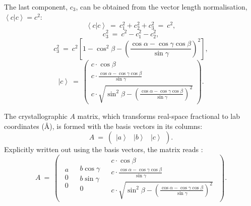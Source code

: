 The last component, $c_3$, can be obtained from the vector length normalisation, $ \left< c | c \right> = c^2 $:
\begin{equation} \left< c | c \right > \ =\  c_1^2 + c_2^2 + c_3^2 \ =\  c^2, \end{equation}
\begin{equation} c_3^2 \ =\  c^2 - c_1^2 - c_2^2, \end{equation}
\begin{equation} 
	c_3^2 \ =\  c^2 \left[1 - \cos^2 \beta - \left(\frac{\cos \alpha - \cos \gamma \cos \beta}{\sin \gamma} \right)^2 \right], 
\end{equation}
\begin{equation} \boxed{ \left| c \right> \ =\  \left( \begin{array}{c}
	c \cdot \cos \beta \\
	c \cdot \frac{\cos \alpha - \cos \gamma \cos \beta}{\sin \gamma} \\
	c \cdot \sqrt{ \sin^2 \beta - \left(\frac{\cos \alpha - \cos \gamma \cos \beta}{\sin \gamma} \right)^2 }
\end{array} \right). } \end{equation}



The crystallographic $A$ matrix, which transforms real-space fractional to lab coordinates (\AA), is formed with the basis vectors in its columns:
\begin{equation}
	A \ =\  \left(
		\begin{array}{ccc}
			\left| a \right> & \left| b \right> & \left| c \right>
		\end{array}
	\right).
\end{equation}
Explicitly written out using the basis vectors, the matrix reads \cite{wiki_fractional}:
\begin{equation}
	A \ =\  \left(
		\begin{array}{ccc}
			\begin{array}{c} a \\ 0 \\ 0 \end{array}
			& 
			\begin{array}{c} b \cos \gamma \\ b \sin \gamma \\ 0 \end{array} 
			& 
			\begin{array}{c}
				c \cdot \cos \beta \\
				c \cdot \frac{\cos \alpha - \cos \gamma \cos \beta}{\sin \gamma} \\
				c \cdot \sqrt{ \sin^2 \beta - \left(\frac{\cos \alpha - \cos \gamma \cos \beta}{\sin \gamma} \right)^2 }
			\end{array}
		\end{array}
	\right).
\end{equation}


